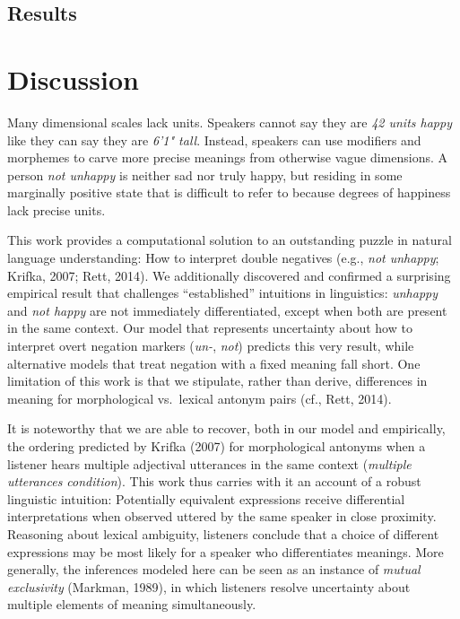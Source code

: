 \documentclass[floatsintext,doc]{apa6}
\begin{document}
\subsection{Results}

\section{Discussion}\label{discussion}


Many dimensional scales lack units.
Speakers cannot say they are \emph{42 units happy} like they can say they are \emph{6'1" tall}.
Instead, speakers can use modifiers and morphemes to carve more precise meanings from otherwise vague dimensions.
A person \emph{not unhappy} is neither sad nor truly happy, but residing in some marginally positive state that is difficult to refer to because degrees of happiness lack precise units.

This work provides a computational solution to an outstanding puzzle in natural language understanding: How to interpret double negatives (e.g., \emph{not unhappy}; Krifka, 2007; Rett, 2014).
We additionally discovered and confirmed a surprising empirical result that challenges ``established'' intuitions in linguistics: \emph{unhappy} and \emph{not happy} are not immediately differentiated, except when both are present in the same context.
Our model that represents uncertainty about how to interpret overt negation markers (\emph{un-}, \emph{not}) predicts this very result, while alternative models that treat negation with a fixed meaning fall short.
One limitation of this work is that we stipulate, rather than derive, differences in meaning for morphological vs.~lexical antonym pairs (cf., Rett, 2014).

It is noteworthy that we are able to recover, both in our model and empirically, the ordering predicted by Krifka (2007) for morphological antonyms when a listener hears multiple adjectival utterances in the same context (\emph{multiple utterances condition}).
This work thus carries with it an account of a robust linguistic intuition: Potentially equivalent expressions receive differential interpretations when observed uttered by the same speaker in close proximity.
Reasoning about lexical ambiguity, listeners conclude that a choice of different expressions may be most likely for a speaker who differentiates meanings.
More generally, the inferences modeled here can be seen as an instance of \emph{mutual exclusivity} (Markman, 1989), in which listeners resolve uncertainty about multiple elements of meaning simultaneously.
\end{document}
